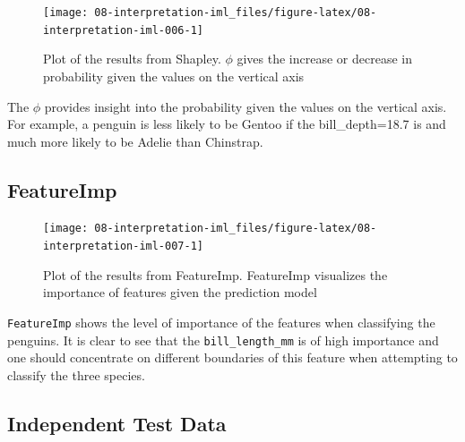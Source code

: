 \documentclass[
]{scrbook}
\newenvironment{Shaded}{\begin{snugshade}}{\end{snugshade}}
\newcommand{\AttributeTok}[1]{\textcolor[rgb]{0.77,0.63,0.00}{#1}}
\newcommand{\FunctionTok}[1]{\textcolor[rgb]{0.00,0.00,0.00}{#1}}
\newcommand{\NormalTok}[1]{#1}
\newcommand{\OtherTok}[1]{\textcolor[rgb]{0.56,0.35,0.01}{#1}}
\newcommand{\SpecialCharTok}[1]{\textcolor[rgb]{0.00,0.00,0.00}{#1}}
\newcommand{\StringTok}[1]{\textcolor[rgb]{0.31,0.60,0.02}{#1}}
\renewenvironment{Shaded} {\begin{snugshade}\small} {\end{snugshade}}
\begin{document}
\begin{figure}

{\centering \texttt{[image: 08-interpretation-iml\_files/figure-latex/08-interpretation-iml-006-1]} 

}

\caption{Plot of the results from Shapley. $\phi$ gives the increase or decrease in probability given the values on the vertical axis}\label{fig:08-interpretation-iml-006}
\end{figure}

The \(\phi\) provides insight into the probability given the values on the vertical axis. For example, a penguin is less likely to be Gentoo if the bill\_depth=18.7 is and much more likely to be Adelie than Chinstrap.

\hypertarget{featureimp}{%
\subsection{FeatureImp}\label{featureimp}}

\begin{Shaded}
\end{Shaded}

\begin{figure}

{\centering \texttt{[image: 08-interpretation-iml\_files/figure-latex/08-interpretation-iml-007-1]} 

}

\caption{Plot of the results from FeatureImp. FeatureImp visualizes the importance of features given the prediction model}\label{fig:08-interpretation-iml-007}
\end{figure}

\texttt{FeatureImp} shows the level of importance of the features when classifying the penguins. It is clear to see that the \texttt{bill\_length\_mm} is of high importance and one should concentrate on different boundaries of this feature when attempting to classify the three species.

\hypertarget{independent-test-data}{%
\subsection{Independent Test Data}\label{independent-test-data}}
\end{document}
